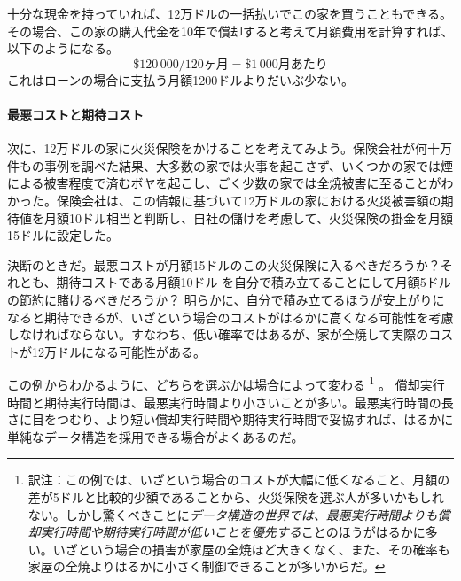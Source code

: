 十分な現金を持っていれば、12万ドルの一括払いでこの家を買うこともできる。その場合、この家の購入代金を10年で償却すると考えて月額費用を計算すれば、以下のようになる。
\[
   \$120\,000 / 120\text{ヶ月} = \$1\,000\text{月あたり}
\]
これはローンの場合に支払う月額1200ドルよりだいぶ少ない。

\paragraph{最悪コストと期待コスト}
次に、12万ドルの家に火災保険をかけることを考えてみよう。保険会社が何十万件もの事例を調べた結果、大多数の家では火事を起こさず、いくつかの家では煙による被害程度で済むボヤを起こし、ごく少数の家では全焼被害に至ることがわかった。保険会社は、この情報に基づいて12万ドルの家における火災被害額の期待値を月額10ドル相当と判断し、自社の儲けを考慮して、火災保険の掛金を月額15ドルに設定した。

決断のときだ。最悪コストが月額15ドルのこの火災保険に入るべきだろうか？それとも、期待コストである月額10ドル
を自分で積み立てることにして月額5ドルの節約に賭けるべきだろうか？
明らかに、自分で積み立てるほうが安上がりになると期待できるが、いざという場合のコストがはるかに高くなる可能性を考慮しなければならない。すなわち、低い確率ではあるが、家が全焼して実際のコストが12万ドルになる可能性がある。

この例からわかるように、どちらを選ぶかは場合によって変わる
\footnote{訳注：この例では、いざという場合のコストが大幅に低くなること、月額の差が5ドルと比較的少額であることから、火災保険を選ぶ人が多いかもしれない。しかし驚くべきことに\emph{データ構造の世界では、最悪実行時間よりも償却実行時間や期待実行時間が低いことを優先する}ことのほうがはるかに多い。いざという場合の損害が家屋の全焼ほど大きくなく、また、その確率も家屋の全焼よりはるかに小さく制御できることが多いからだ。} %
。
償却実行時間と期待実行時間は、最悪実行時間より小さいことが多い。最悪実行時間の長さに目をつむり、より短い償却実行時間や期待実行時間で妥協すれば、はるかに単純なデータ構造を採用できる場合がよくあるのだ。

